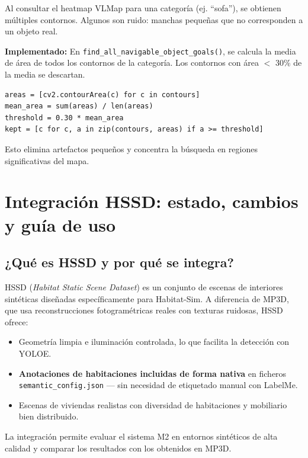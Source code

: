 \documentclass[11pt,a4paper]{article}
\begin{document}
Al consultar el heatmap VLMap para una categoría (ej. ``sofa''), se obtienen múltiples contornos. Algunos son ruido: manchas pequeñas que no corresponden a un objeto real.

\textbf{Implementado:} En \texttt{find\_all\_navigable\_object\_goals()}, se calcula la media de área de todos los contornos de la categoría. Los contornos con área $<$ 30\% de la media se descartan.

\begin{verbatim}
areas = [cv2.contourArea(c) for c in contours]
mean_area = sum(areas) / len(areas)
threshold = 0.30 * mean_area
kept = [c for c, a in zip(contours, areas) if a >= threshold]
\end{verbatim}

Esto elimina artefactos pequeños y concentra la búsqueda en regiones significativas del mapa.

\section{Integración HSSD: estado, cambios y guía de uso}

\subsection{¿Qué es HSSD y por qué se integra?}

HSSD (\textit{Habitat Static Scene Dataset}) es un conjunto de escenas de interiores sintéticas diseñadas específicamente para Habitat-Sim. A diferencia de MP3D, que usa reconstrucciones fotogramétricas reales con texturas ruidosas, HSSD ofrece:

\begin{itemize}
    \item Geometría limpia e iluminación controlada, lo que facilita la detección con YOLOE.
    \item \textbf{Anotaciones de habitaciones incluidas de forma nativa} en ficheros \texttt{semantic\_config.json} --- sin necesidad de etiquetado manual con LabelMe.
    \item Escenas de viviendas realistas con diversidad de habitaciones y mobiliario bien distribuido.
\end{itemize}

La integración permite evaluar el sistema M2 en entornos sintéticos de alta calidad y comparar los resultados con los obtenidos en MP3D.
\end{document}
